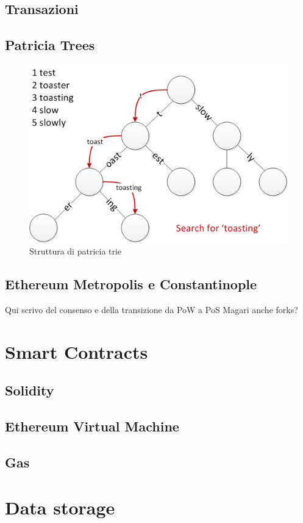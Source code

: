 \subsection{Transazioni}

\subsection{Patricia Trees}

\begin{figure}[H]
\centering
\includegraphics[width=1\textwidth]{immagini/patricia_trie.png}
\caption{Struttura di patricia trie}
\label{fig:mesh6}
\end{figure}

\subsection{Ethereum Metropolis e Constantinople}

Qui scrivo del consenso e della transizione da PoW a PoS
Magari anche forks?

\section{Smart Contracts}

\subsection{Solidity}

\subsection{Ethereum Virtual Machine}

\subsection{Gas}

\section{Data storage}